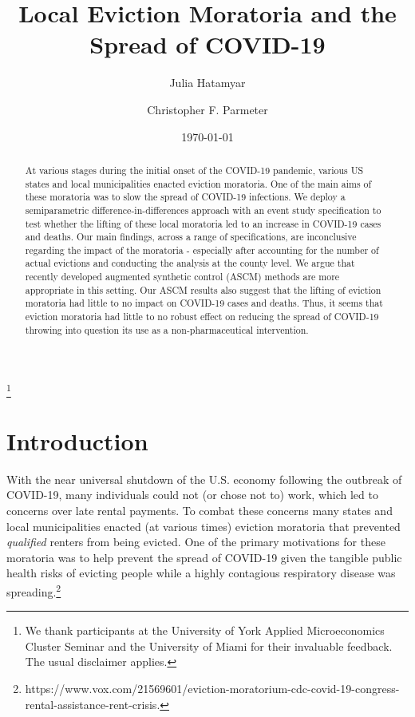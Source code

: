 \documentclass[12pt]{amsart}
\begin{document}
	
\title[COVID and Evictions]{Local Eviction Moratoria and the Spread of COVID-19}
\date{\today}

\author{Julia Hatamyar}
\author{Christopher F. Parmeter}

\thanks{We thank participants at the University of York Applied Microeconomics Cluster Seminar and the University of Miami for their invaluable feedback. The usual disclaimer applies.}

\begin{abstract}
At various stages during the initial onset of the COVID-19 pandemic, various US states and local municipalities enacted eviction moratoria. One of the main aims of these moratoria was to slow the spread of COVID-19 infections. We deploy a semiparametric difference-in-differences approach with an event study specification to test whether the lifting of these local moratoria led to an increase in COVID-19 cases and deaths. Our main findings, across a range of specifications, are inconclusive regarding the impact of the moratoria - especially after accounting for the number of actual evictions and conducting the analysis at the county level. We argue that recently developed augmented synthetic control (ASCM) methods are more appropriate in this setting. Our ASCM results also suggest that the lifting of eviction moratoria had little to no impact on COVID-19 cases and deaths. Thus, it seems that eviction moratoria had little to no robust effect on reducing the spread of COVID-19 throwing into question its use as a non-pharmaceutical intervention.
\end{abstract}

\maketitle


\section{Introduction}

With the near universal shutdown of the U.S. economy following the outbreak of COVID-19, many individuals could not (or chose not to) work, which led to concerns over late rental payments. To combat these concerns many states and local municipalities enacted (at various times) eviction moratoria that prevented \textit{qualified} renters from being evicted. One of the primary motivations for these moratoria was to help prevent the spread of COVID-19 given the tangible public health risks of evicting people while a highly contagious respiratory disease was spreading.\footnote{https://www.vox.com/21569601/eviction-moratorium-cdc-covid-19-congress-rental-assistance-rent-crisis.}
\end{document}
